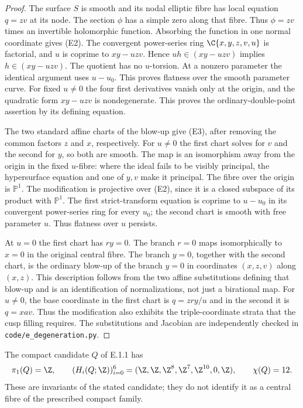 \begin{proof}
The surface $S$ is smooth and its nodal elliptic fibre has local
equation $q=zv$ at its node. The section $\phi$ has a simple zero
along that fibre. Thus $\phi=zv$ times an invertible holomorphic
function. Absorbing the function in one normal coordinate gives (E2).
The convergent power-series ring $\C\{x,y,z,v,u\}$ is factorial,
and $u$ is coprime to $xy-uzv$. Hence $uh\in(xy-uzv)$ implies
$h\in(xy-uzv)$. The quotient has no $u$-torsion. At a nonzero
parameter the identical argument uses $u-u_0$. This proves flatness
over the smooth parameter curve.
For fixed $u\ne0$ the four first derivatives vanish only at the
origin, and the quadratic form $xy-uzv$ is nondegenerate. This proves
the ordinary-double-point assertion by its defining equation.

The two standard affine charts of the blow-up give (E3), after
removing the common factors $z$ and $x$, respectively. For $u\ne0$
the first chart solves for $v$ and the second for $y$, so both are
smooth. The map is an isomorphism away from the origin in the fixed
$u$-fibre: where the ideal fails to be visibly principal, the
hypersurface equation and one of $y,v$ make it principal. The fibre
over the origin is $\mathbb P^1$. The modification is projective
over (E2), since it is a closed subspace of its product with
$\mathbb P^1$. The first strict-transform equation is coprime to
$u-u_0$ in its convergent power-series ring for every $u_0$; the
second chart is smooth with free parameter $u$. Thus flatness over
$u$ persists.

At $u=0$ the first chart has $ry=0$. The branch $r=0$ maps
isomorphically to $x=0$ in the original central fibre. The branch
$y=0$, together with the second chart, is the ordinary blow-up of the
branch $y=0$ in coordinates $(x,z,v)$ along $(x,z)$. This description
follows from the two affine substitutions defining that blow-up and
is an identification of normalizations, not just a birational map.
For $u\ne0$, the base coordinate in the first chart is
$q=zry/u$ and in the second it is $q=xav$. Thus the modification also
exhibits the triple-coordinate strata that the cusp filling requires.
The substitutions and Jacobian are independently checked in
\texttt{code/e\_degeneration.py}.
\end{proof}

\begin{proposition}\label{fam:src:E.1.4}\label{fam:st:E.1.4}
The compact candidate $Q$ of E.1.1 has
\[
 \pi_1(Q)=\Z,\qquad
 (H_i(Q;\Z))_{i=0}^6
   =(\Z,\Z,\Z^8,\Z^7,\Z^{10},0,\Z),\qquad\chi(Q)=12.
\]
These are invariants of the stated candidate; they do not identify it
as a central fibre of the prescribed compact family.
\end{proposition}

